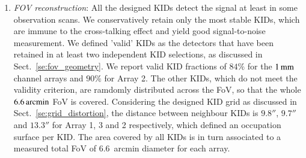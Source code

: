 \documentclass{aa}
\begin{document}
\begin{table*}[!thbp]
{    
  }
\end{table*}


\begin{enumerate}
\item \emph{FOV reconstruction}: All the designed KIDs detect the signal at least in some observation
  scans. We conservatively retain only the most stable KIDs, which are
  immune to the cross-talking effect and yield good signal-to-noise
  measurement. We defined 'valid' KIDs as the detectors that have been
  retained in at least two independent KID selections, as discussed in
  Sect.~\ref{se:fov_geometry}. We report valid KID fractions of $84\%$
  for the $1\,\rm{mm}$ channel arrays and $90\%$ for Array 2. The other
  KIDs, which do not meet the validity criterion, are ramdomly
  distributed across the FoV, so that the whole $6.6\,\rm{arcmin}$ FoV is
  covered. Considering the designed KID grid as discussed in
  Sect.~\ref{se:grid_distortion}, the distance between
  neighbour KIDs is $9.8''$, $9.7''$ and $13.3''$ for Array 1, 3 and 2
  respectively, which defined an occupation surface per KID. The area
  covered by all KIDs is in turn associated to a measured total FoV of
  $6.6$~arcmin diameter for each array.
  

\end{enumerate}
\end{document}
